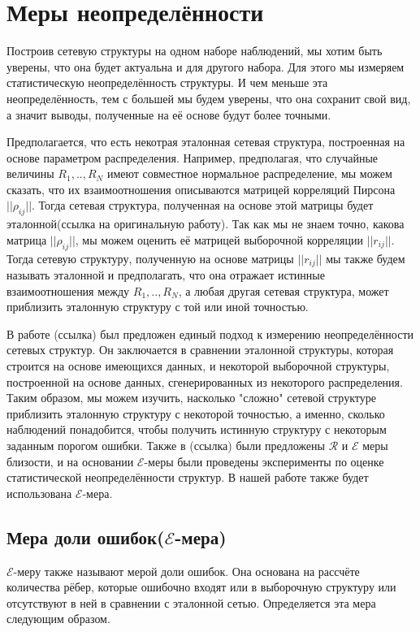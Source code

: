 \section{Меры неопределённости}


Построив сетевую структуры на одном наборе наблюдений, мы хотим быть уверены, что она будет актуальна и для другого набора. Для этого мы измеряем статистическую неопределённость структуры. И чем меньше эта неопределённость, тем с большей мы будем  уверены, что она сохранит свой вид, а значит выводы, полученные на её основе будут более точными. 

Предполагается, что есть некотрая эталонная сетевая структура, построенная на основе параметром распределения. Например, предполагая, что случайные величины $R_1, .., R_N$ имеют совместное нормальное распределение, мы можем сказать, что их взаимоотношения описываются матрицей корреляций Пирсона $||\rho_{i j}||$. Тогда сетевая структура, полученная на основе этой матрицы будет эталонной(ссылка на оригинальную работу). Так как мы не знаем точно, какова матрица $||\rho_{i j}||$, мы можем оценить её матрицей выборочной корреляции $||r_{i j}||$. Тогда сетевую структуру, полученную на основе  матрицы $||r_{i j}||$ мы также будем называть эталонной и предполагать, что она отражает истинные взаимоотношения между $R_1, .., R_N$,  а любая другая сетевая структура, может приблизить эталонную структуру с той или иной точностью. 


В работе (ссылка) был предложен единый подход к измерению неопределённости сетевых структур. Он заключается в сравнении эталонной структуры, которая строится на основе имеющихся данных, и некоторой выборочной структуры, построенной на основе данных, сгенерированных из некоторого распределения. Таким образом, мы можем изучить, насколько "сложно" сетевой структуре приблизить эталонную структуру с некоторой точностью, а именно, сколько наблюдений понадобится, чтобы получить истинную структуру с некоторым заданным порогом ошибки. Также  в (ссылка) были предложены $\mathcal{R}$ и $\mathcal{E}$ меры близости, и на основании $\mathcal{E}$-меры были проведены эксперименты по оценке статистической неопределённости структур. В нашей работе также будет использована $\mathcal{E}$-мера.


\subsection{Мера доли ошибок($\mathcal{E}$-мера)}

$\mathcal{E}$-меру также называют мерой доли ошибок. Она основана на рассчёте количества рёбер, которые ошибочно входят или в выборочную структуру или отсутствуют в ней в сравнении с эталонной сетью.
Определяется эта мера следующим образом.

